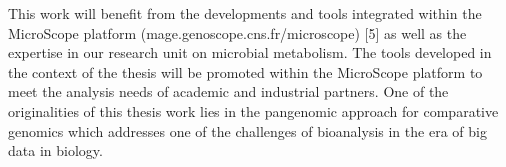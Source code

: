 \begin{mdframed}[linecolor=Prune,linewidth=1]
\begin{multicols}{2}
This work will benefit from the developments and tools integrated within the MicroScope platform (mage.genoscope.cns.fr/microscope) [5] as well as the expertise in our research unit on microbial metabolism. The tools developed in the context of the thesis will be promoted within the MicroScope platform to meet the analysis needs of academic and industrial partners. One of the originalities of this thesis work lies in the pangenomic approach for comparative genomics which addresses one of the challenges of bioanalysis in the era of big data in biology.
\end{multicols}
\end{mdframed}